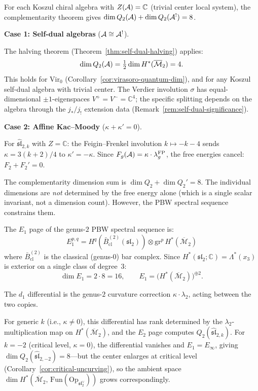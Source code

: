 \begin{computation}%
\label{comp:genus2-complementarity-table}
For each Koszul chiral algebra with $Z(\mathcal{A}) = \mathbb{C}$
(trivial center local system), the complementarity
theorem gives $\dim Q_2(\mathcal{A}) + \dim Q_2(\mathcal{A}^!) = 8$.

\smallskip
\noindent\textbf{Case 1: Self-dual algebras} ($\mathcal{A} \cong \mathcal{A}^!$).

The halving theorem (Theorem~\ref{thm:self-dual-halving}) applies:
\begin{equation}\label{eq:genus2-self-dual-dims}
\dim Q_2(\mathcal{A}) = \tfrac{1}{2}\dim H^*(\overline{\mathcal{M}}_2) = 4.
\end{equation}
This holds for
$\mathrm{Vir}_0$ (Corollary~\ref{cor:virasoro-quantum-dim}),
and for any Koszul self-dual algebra with trivial center.
The Verdier involution $\sigma$ has equal-dimensional $\pm 1$-eigenspaces
$V^+ = V^- = \mathbb{C}^4$; the specific splitting depends on the
algebra through the $j_*/j_!$ extension data
(Remark~\ref{rem:self-dual-significance}).

\smallskip
\noindent\textbf{Case 2: Affine Kac--Moody} ($\kappa + \kappa' = 0$).

For $\widehat{\mathfrak{sl}}_{2,k}$ with $Z = \mathbb{C}$:
the Feigin--Frenkel involution $k \mapsto -k-4$ sends
$\kappa = 3(k+2)/4$ to $\kappa' = -\kappa$.  Since
$F_g(\mathcal{A}) = \kappa \cdot \lambda_g^{\mathrm{FP}}$, the free
energies cancel: $F_2 + F_2' = 0$.

The complementarity dimension sum is $\dim Q_2 + \dim Q_2' = 8$.
The individual dimensions are \emph{not} determined by the free
energy alone (which is a single scalar invariant, not a dimension
count).  However, the PBW spectral sequence constrains them.

The $E_1$ page of the genus-$2$ PBW spectral sequence is:
\[
E_1^{p,q} = H^q(\bar{B}^{(2)}_{\mathrm{cl}}(\mathfrak{sl}_2))
\otimes \mathrm{gr}^p \, H^*(\overline{\mathcal{M}}_2)
\]
where $\bar{B}^{(2)}_{\mathrm{cl}}$ is the classical (genus-$0$) bar
complex.  Since $H^*(\mathfrak{sl}_2;\mathbb{C}) =
\Lambda^*(x_3)$ is exterior on a single class of degree~$3$:
\[
\dim E_1 = 2 \cdot 8 = 16, \qquad
E_1 = \bigl(H^*(\overline{\mathcal{M}}_2)\bigr)^{\oplus 2}.
\]

The $d_1$ differential is the genus-$2$ curvature correction
$\kappa \cdot \lambda_2$, acting between the two copies.

For generic $k$ (i.e., $\kappa \neq 0$), this differential
has rank determined by the $\lambda_2$-multiplication map on
$H^*(\overline{\mathcal{M}}_2)$, and the $E_2$ page computes
$Q_2(\widehat{\mathfrak{sl}}_{2,k})$.  For $k = -2$ (critical level,
$\kappa = 0$), the differential vanishes and $E_1 = E_\infty$, giving
$\dim Q_2(\widehat{\mathfrak{sl}}_{2,-2}) = 8$---but the center
enlarges at critical level
(Corollary~\ref{cor:critical-uncurving}), so the ambient space
$\dim H^*(\overline{\mathcal{M}}_2,\,
\mathrm{Fun}(\mathrm{Op}_{\mathfrak{sl}_2^\vee}))$
grows correspondingly.


\end{computation}
